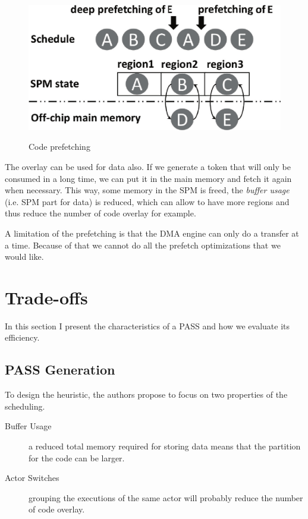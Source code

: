 \documentclass{article}
\begin{document}
\begin{figure}
\caption{Code prefetching}
\centering
\includegraphics[scale=0.175]{fig3}
\label{fig3}
\end{figure}

The overlay can be used for data also.
If we generate a token that will only be consumed in a long time, we can put it in the main memory and fetch it again when necessary.
This way, some memory in the SPM is freed, the \textit{buffer usage} (i.e. SPM part for data) is reduced, which can allow to have more regions and thus reduce the number of code overlay for example.

A limitation of the prefetching is that the DMA engine can only do a transfer at a time.
Because of that we cannot do all the prefetch optimizations that we would like.



\section{Trade-offs}
\label{tradeoffs}
In this section I present the characteristics of a PASS and how we evaluate its efficiency.

\subsection{PASS Generation}
To design the heuristic, the authors propose to focus on two properties of the scheduling.
\begin{description}
  \item[Buffer Usage] a reduced total memory required for storing data means that the partition for the code can be larger.
  \item[Actor Switches] grouping the executions of the same actor will probably reduce the number of code overlay.
\end{description}
\end{document}
